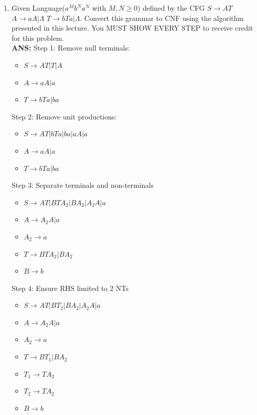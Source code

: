 \documentclass[letterpaper, 12 pt]{article}
\begin{document}
\begin{enumerate}
    \item[17.] Given Language($a^Mb^Na^N$ with $M,N\geq 0$) defined by the CFG
        $S \to AT$ $A\to aA|\Lambda$ $T\to bTa|\Lambda$. Convert this grammar to CNF using
        the algorithm presented in this lecture. You MUST SHOW EVERY STEP to
        receive credit for this problem. \\
        \textbf{ANS:} 
        Step 1: Remove null terminals:
        \begin{itemize}
            \item $S \to AT | T | A$
            \item $A \to aA | a$
            \item $T \to bTa | ba$
        \end{itemize}
        Step 2: Remove unit productions:
        \begin{itemize}
            \item $S \to AT | bTa | ba | aA | a$
            \item $A \to aA | a$
            \item $T \to bTa | ba$
        \end{itemize}
        Step 3: Separate terminals and non-terminals
        \begin{itemize}
            \item $S \to AT | BTA_2 | BA_2 | A_2A | a$
            \item $A \to A_2A | a$
            \item $A_2 \to a$
            \item $T \to BTA_2 | BA_2$
            \item $B \to b$
        \end{itemize}
        Step 4: Ensure RHS limited to 2 NTs
        \begin{itemize}
            \item $S \to AT | BT_2 | BA_2 | A_2A | a$
            \item $A \to A_2A | a$
            \item $A_2 \to a$
            \item $T \to BT_1 | BA_2$
            \item $T_1 \to TA_2$
            \item $T_2 \to TA_2$
            \item $B \to b$
        \end{itemize}


\end{enumerate}
\end{document}
